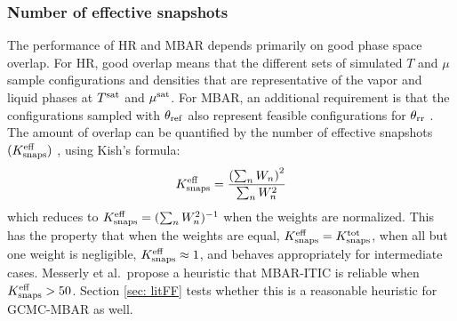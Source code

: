 \documentclass[journal=jced,manuscript=article]{achemso}
\begin{document}
\subsubsection{Number of effective snapshots} \label{sec: Keff}

The performance of HR and MBAR depends primarily on good phase space overlap. For HR, good overlap means that the different sets of simulated $T$ and $\mu$ sample configurations and densities that are representative of the vapor and liquid phases at $T^{\rm sat}$ and $\mu^{\rm sat}$. For MBAR, an additional requirement is that the configurations sampled with $\theta_{\rm ref}$ also represent feasible configurations for $\theta_{\rm rr}$ \cite{naden:jctc:2016,Postdoc_1}. The amount of overlap can be quantified by the number of effective snapshots $(K^{\rm eff}_{\rm snaps})$ \cite{Dybeck2016}, using Kish's formula:
\begin{eqnarray} \label{Neff_lit}
K^{\rm eff}_{\rm snaps} = \frac{\left(\sum_n W_n\right)^2}{\sum_n W_n^2}
\end{eqnarray}
which reduces to $K^{\rm eff}_{\rm snaps}  = (\sum_n W_n^2)^{-1}$ when the weights are
normalized. This has the property that when the weights are equal,
$K^{\rm eff}_{\rm snaps}  = K^{\rm tot}_{\rm snaps} $, when all but one weight is negligible, $K^{\rm eff}_{\rm snaps}  \approx
1$, and behaves appropriately for intermediate cases. Messerly et al.~propose a heuristic that MBAR-ITIC is reliable when $K^{\rm eff}_{\rm snaps} > 50$. Section \ref{sec: litFF} tests whether this is a reasonable heuristic for GCMC-MBAR as well. 

\end{document}
